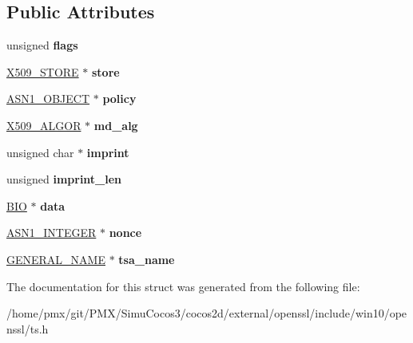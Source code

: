 \subsection*{Public Attributes}
\begin{DoxyCompactItemize}
\item 
\mbox{\label{structTS__verify__ctx_a5e906cf22084ef30d67bdb15df294480}} 
unsigned {\bfseries flags}
\item 
\mbox{\label{structTS__verify__ctx_a9aa523132a1fc3f0c6f5330b524e177f}} 
\hyperlink{structx509__store__st}{X509\+\_\+\+S\+T\+O\+RE} $\ast$ {\bfseries store}
\item 
\mbox{\label{structTS__verify__ctx_ab433c7a76c0dd42e99eb654aa7c459fa}} 
\hyperlink{structasn1__object__st}{A\+S\+N1\+\_\+\+O\+B\+J\+E\+CT} $\ast$ {\bfseries policy}
\item 
\mbox{\label{structTS__verify__ctx_a1875de1fef64a6d896f228badbdd2ddf}} 
\hyperlink{structX509__algor__st}{X509\+\_\+\+A\+L\+G\+OR} $\ast$ {\bfseries md\+\_\+alg}
\item 
\mbox{\label{structTS__verify__ctx_a97e06ef1b0ab4490f7f50f06933c4187}} 
unsigned char $\ast$ {\bfseries imprint}
\item 
\mbox{\label{structTS__verify__ctx_a4b7cf5f0d8930796aeac6966712612bb}} 
unsigned {\bfseries imprint\+\_\+len}
\item 
\mbox{\label{structTS__verify__ctx_a093f5641e9235cf8523d18b550bee7f4}} 
\hyperlink{structbio__st}{B\+IO} $\ast$ {\bfseries data}
\item 
\mbox{\label{structTS__verify__ctx_a3b3407367a1dd2b12053d527040b28a2}} 
\hyperlink{structasn1__string__st}{A\+S\+N1\+\_\+\+I\+N\+T\+E\+G\+ER} $\ast$ {\bfseries nonce}
\item 
\mbox{\label{structTS__verify__ctx_aa41f4334c8821a67eca400e955957f57}} 
\hyperlink{structGENERAL__NAME__st}{G\+E\+N\+E\+R\+A\+L\+\_\+\+N\+A\+ME} $\ast$ {\bfseries tsa\+\_\+name}
\end{DoxyCompactItemize}


The documentation for this struct was generated from the following file\+:\begin{DoxyCompactItemize}
\item 
/home/pmx/git/\+P\+M\+X/\+Simu\+Cocos3/cocos2d/external/openssl/include/win10/openssl/ts.\+h\end{DoxyCompactItemize}

